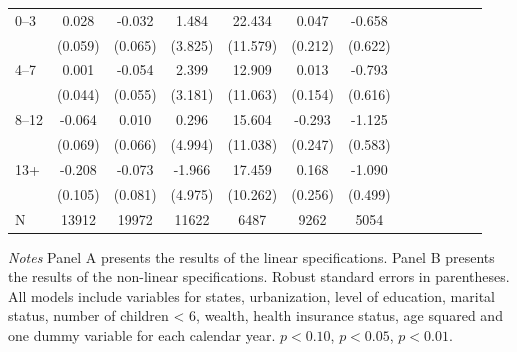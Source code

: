 \documentclass[12pt,english]{article}
\providecommand{\DIFaddtex}[1]{{\protect\color{blue}#1}} %
\providecommand{\DIFaddend}{} %
\providecommand{\DIFaddFL}[1]{\DIFadd{#1}} %
\providecommand{\DIFadd}[1]{\texorpdfstring{\DIFaddtex{#1}}{#1}} %
\begin{document}
\begin{table}[!ht]
\begin{center}
\begin{adjustbox}{max width=.9\linewidth}
\begin{threeparttable}
{\begin{tabular}{l*{6}{S S}}
						\DIFaddFL{0--3}&   \DIFaddFL{0.028         }&   \DIFaddFL{-0.032         }&    \DIFaddFL{1.484         }&   \DIFaddFL{22.434}\sym{*}  &    \DIFaddFL{0.047         }&   \DIFaddFL{-0.658         }\\
						&  \DIFaddFL{(0.059)         }&  \DIFaddFL{(0.065)         }&  \DIFaddFL{(3.825)         }& \DIFaddFL{(11.579)         }&  \DIFaddFL{(0.212)         }&  \DIFaddFL{(0.622)         }\\
						\DIFaddFL{4--7}&    \DIFaddFL{0.001         }&   \DIFaddFL{-0.054         }&    \DIFaddFL{2.399         }&   \DIFaddFL{12.909         }&    \DIFaddFL{0.013         }&   \DIFaddFL{-0.793         }\\
						&  \DIFaddFL{(0.044)         }&  \DIFaddFL{(0.055)         }&  \DIFaddFL{(3.181)         }& \DIFaddFL{(11.063)         }&  \DIFaddFL{(0.154)         }&  \DIFaddFL{(0.616)         }\\
						\DIFaddFL{8--12}&   \DIFaddFL{-0.064         }&    \DIFaddFL{0.010         }&    \DIFaddFL{0.296         }&   \DIFaddFL{15.604         }&   \DIFaddFL{-0.293         }&   \DIFaddFL{-1.125}\sym{*}  \\
						&  \DIFaddFL{(0.069)         }&  \DIFaddFL{(0.066)         }&  \DIFaddFL{(4.994)         }& \DIFaddFL{(11.038)         }&  \DIFaddFL{(0.247)         }&  \DIFaddFL{(0.583)         }\\
						\DIFaddFL{13+}& \DIFaddFL{-0.208}\sym{**} &   \DIFaddFL{-0.073         }&   \DIFaddFL{-1.966         }&   \DIFaddFL{17.459}\sym{*}  &    \DIFaddFL{0.168         }&   \DIFaddFL{-1.090}\sym{**} \\
						&  \DIFaddFL{(0.105)         }&  \DIFaddFL{(0.081)         }&  \DIFaddFL{(4.975)         }& \DIFaddFL{(10.262)         }&  \DIFaddFL{(0.256)         }&  \DIFaddFL{(0.499)         }\\
						\midrule
					\DIFaddFL{N         }&    \DIFaddFL{13912         }&    \DIFaddFL{19972         }&    \DIFaddFL{11622         }&     \DIFaddFL{6487         }&     \DIFaddFL{9262         }&     \DIFaddFL{5054         }\\
						\bottomrule
					\end{tabular}
					\begin{tablenotes}
						\item \footnotesize \textit{\DIFaddFL{Notes}} \DIFaddFL{Panel A presents the results of the linear specifications. Panel B presents the results of the non-linear specifications. Robust standard errors in parentheses. All models include variables for  states, urbanization, level of education, marital status, number of children < 6, wealth, health insurance status, age squared and one dummy variable for each calendar year. }\sym{*} \DIFaddFL{\(p<0.10\), }\sym{**} \DIFaddFL{\(p<0.05\), }\sym{***} \DIFaddFL{\(p<0.01\).
					}\end{tablenotes}
				}
			\end{threeparttable}
		\end{adjustbox}
	\end{center}
\end{table}
\DIFaddend 
\end{document}
